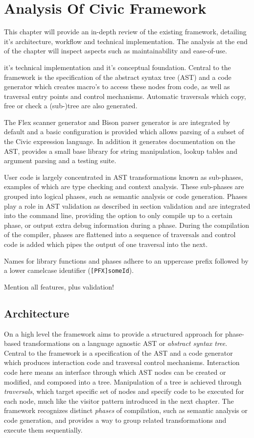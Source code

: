 \documentclass[twoside,openright]{uva-bachelor-thesis}
\newcommand{\code}[1]{\texttt{\footnotesize#1}}
\begin{document}
\chapter{Analysis Of Civic Framework}
\label{chap:analysis}
	This chapter will provide an in-depth review of the existing framework, detailing it's architecture, workflow and technical implementation. The analysis at the end of the chapter will inspect aspects such as maintainability and ease-of-use.
		
	it's technical implementation and it's conceptual foundation.  Central to the framework is the specification of the abstract syntax tree (AST) and a code generator which creates macro's to access these nodes from code, as well as traversal entry points and control mechanisms. Automatic traversals which copy, free or check a (sub-)tree are also generated.
	
	The Flex scanner generator and Bison parser generator is are integrated by default and a basic configuration is provided which allows parsing of a subset of the Civic expression language. In addition it generates documentation on the AST, provides a small base library for string manipulation, lookup tables and argument parsing and a testing suite.
	
	
	User code is largely concentrated in AST transformations known as sub-phases, examples of which are type checking and context analysis. These sub-phases are grouped into logical phases, such as semantic analysis or code generation. Phases play a role in AST validation as described in section validation and are integrated into the command line, providing the option to only compile up to a certain phase, or output extra debug information during a phase. During the compilation of the compiler, phases are flattened into a sequence of traversals and control code is added which pipes the output of one traversal into the next.
	
	Names for library functions and phases adhere to an uppercase prefix followed by a lower camelcase identifier (\code{[PFX]someId}).
	
	
	Mention all features, plus validation!
	
			
				
	\section{Architecture}
		On a high level the framework aims to provide a structured approach for phase-based transformations on a language agnostic AST or \emph{abstract syntax tree}. Central to the framework is a specification of the AST and a code generator which produces interaction code and traversal control mechanisms. Interaction code here means an interface through which AST nodes can be created or modified, and composed into a tree. Manipulation of a tree is achieved through \emph{traversals}, which target specific set of nodes and specify code to be executed for each node, much like the visitor pattern introduced in the next chapter. The framework recognizes distinct \emph{phases} of compilation, such as semantic analysis or code generation, and provides a way to group related transformations and execute them sequentially.
				
\end{document}
